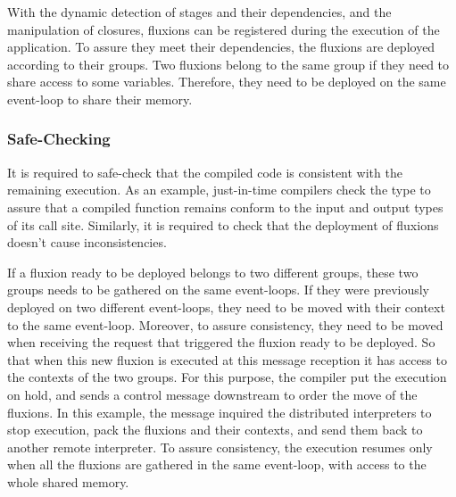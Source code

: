 With the dynamic detection of stages and their dependencies, and the manipulation of closures, fluxions can be registered during the execution of the application.
To assure they meet their dependencies, the fluxions are deployed according to their groups.
Two fluxions belong to the same group if they need to share access to some variables.
Therefore, they need to be deployed on the same event-loop to share their memory.

\subsubsection{Safe-Checking}

It is required to safe-check that the compiled code is consistent with the remaining execution.
As an example, just-in-time compilers check the type to assure that a compiled function remains conform to the input and output types of its call site.
Similarly, it is required to check that the deployment of fluxions doesn't cause inconsistencies.

If a fluxion ready to be deployed belongs to two different groups, these two groups needs to be gathered on the same event-loops.
If they were previously deployed on two different event-loops, they need to be moved with their context to the same event-loop.
Moreover, to assure consistency, they need to be moved when receiving the request that triggered the fluxion ready to be deployed.
So that when this new fluxion is executed at this message reception it has access to the contexts of the two groups.
For this purpose, the compiler put the execution on hold, and sends a control message downstream to order the move of the fluxions.
In this example, the message inquired the distributed interpreters to stop execution, pack the fluxions and their contexts, and send them back to another remote interpreter.
To assure consistency, the execution resumes only when all the fluxions are gathered in the same event-loop, with access to the whole shared memory.


